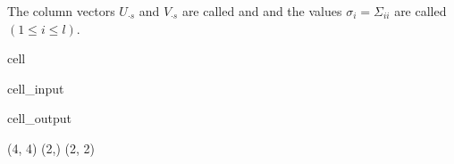 \documentclass[letterpaper,10pt,english]{jupyterBook}
\begin{document}
\sphinxAtStartPar
The column vectors \(U_{\cdot s}\) and \(V_{\cdot s}\) are called  and  and the values \(\sigma_i=\Sigma_{ii}\) are called  \((1\leq i\leq l)\).

\begin{sphinxuseclass}{cell}\begin{sphinxVerbatimInput}

\begin{sphinxuseclass}{cell_input}
\begin{sphinxVerbatim}[commandchars=\\\{\}]
  
   
  
\end{sphinxVerbatim}

\end{sphinxuseclass}\end{sphinxVerbatimInput}
\begin{sphinxVerbatimOutput}

\begin{sphinxuseclass}{cell_output}
\begin{sphinxVerbatim}[commandchars=\\\{\}]
(4, 4) (2,) (2, 2)
\end{sphinxVerbatim}

\end{sphinxuseclass}\end{sphinxVerbatimOutput}

\end{sphinxuseclass}
\end{document}
